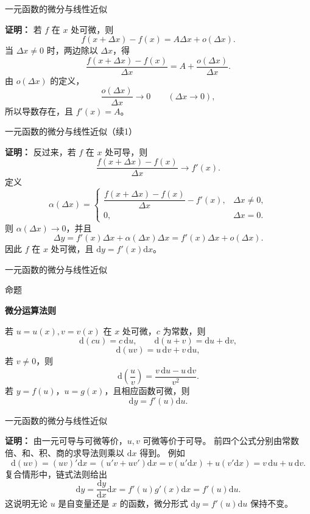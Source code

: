 \documentclass[aspectratio=169,10pt,fontset=fandol]{ctexbeamer}
\newcommand{\dd}{\mathrm{d}}
\begin{document}
\begin{frame}[t,fragile]{一元函数的微分与线性近似}
\footnotesize
{\footnotesize
\textbf{证明：}
若 $f$ 在 $x$ 处可微，则
\[
f(x+\Delta x)-f(x)=A\Delta x+o(\Delta x).
\]
当 $\Delta x\neq0$ 时，两边除以 $\Delta x$，得
\[
\frac{f(x+\Delta x)-f(x)}{\Delta x}
=A+\frac{o(\Delta x)}{\Delta x}.
\]
由 $o(\Delta x)$ 的定义，
\[
\frac{o(\Delta x)}{\Delta x}\to0\qquad(\Delta x\to0),
\]
所以导数存在，且 $f'(x)=A$。


}
\end{frame}
\begin{frame}[t,fragile]{一元函数的微分与线性近似（续1）}
\footnotesize
{\footnotesize
\textbf{证明：}
反过来，若 $f$ 在 $x$ 处可导，则
\[
\frac{f(x+\Delta x)-f(x)}{\Delta x}\to f'(x).
\]
定义
\[
\alpha(\Delta x)=
\begin{cases}
\dfrac{f(x+\Delta x)-f(x)}{\Delta x}-f'(x),&\Delta x\neq0,\\[0.8em]
0,&\Delta x=0.
\end{cases}
\]
则 $\alpha(\Delta x)\to0$，并且
\[
\Delta y=f'(x)\Delta x+\alpha(\Delta x)\Delta x
=f'(x)\Delta x+o(\Delta x).
\]
因此 $f$ 在 $x$ 处可微，且 $\dd y=f'(x)\dd x$。

}
\end{frame}
\begin{frame}[t,fragile]{一元函数的微分与线性近似}
\footnotesize
\begin{block}{命题}
{\footnotesize
\textbf{微分运算法则}\par

若 $u=u(x),v=v(x)$ 在 $x$ 处可微，$c$ 为常数，则
\[
\dd(cu)=c\,\dd u,\qquad \dd(u+v)=\dd u+\dd v,
\]
\[
\dd(uv)=u\,\dd v+v\,\dd u,
\]
若 $v\neq0$，则
\[
\dd\left(\frac{u}{v}\right)=\frac{v\,\dd u-u\,\dd v}{v^2}.
\]
若 $y=f(u)$，$u=g(x)$，且相应函数可微，则
\[
\dd y=f'(u)\dd u.
\]

}
\end{block}
\end{frame}
\begin{frame}[t,fragile]{一元函数的微分与线性近似}
\footnotesize
{\footnotesize
\textbf{证明：}
由一元可导与可微等价，$u,v$ 可微等价于可导。 前四个公式分别由常数倍、和、积、商的求导法则乘以 $\dd x$ 得到。 例如
\[
\dd(uv)=(uv)'\dd x=(u'v+uv')\dd x=v(u'\dd x)+u(v'\dd x)=v\,\dd u+u\,\dd v.
\]
复合情形中，链式法则给出
\[
\dd y=\frac{\dd y}{\dd x}\dd x=f'(u)g'(x)\dd x=f'(u)\dd u.
\]
这说明无论 $u$ 是自变量还是 $x$ 的函数，微分形式 $\dd y=f'(u)\dd u$ 保持不变。

}
\end{frame}
\end{document}
